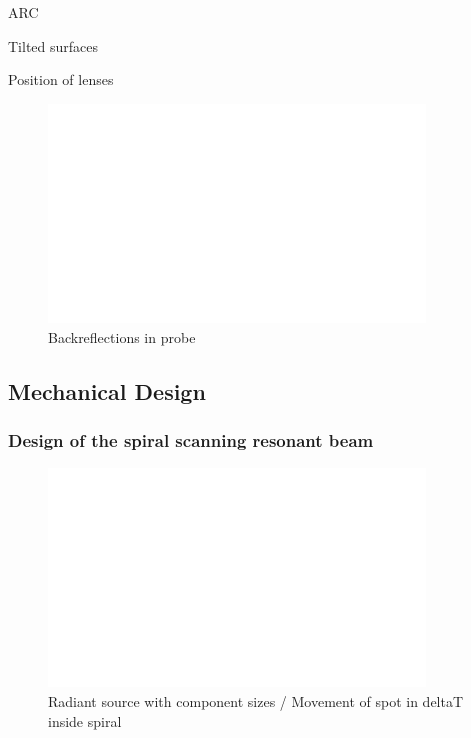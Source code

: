 ARC

Tilted surfaces

Position of lenses

\begin{figure}[h!]\centering \includegraphics[width=10cm,draft]{figures/foo.png}
      \caption{Backreflections in probe}
\end{figure}



\newpage
\subsection{Mechanical Design}

\subsubsection{Design of the spiral scanning resonant beam}

\begin{figure}[h!]\centering \includegraphics[width=10cm,draft]{figures/foo.png}
      \caption{Radiant source with component sizes / Movement of spot in deltaT inside spiral}
\end{figure}

